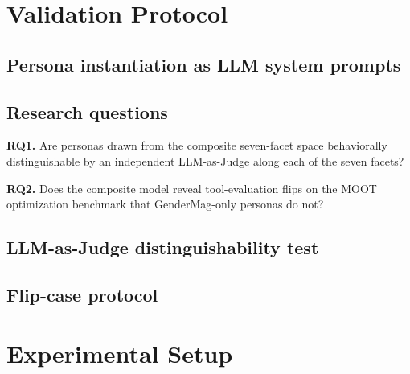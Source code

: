 \documentclass[10pt,conference]{IEEEtran}
\begin{document}
\section{Validation Protocol}
\label{sec:method}


\subsection{Persona instantiation as LLM system prompts}

\subsection{Research questions}
\textbf{RQ1.} Are personas drawn from the composite seven-facet space
behaviorally distinguishable by an independent LLM-as-Judge along each of
the seven facets?

\textbf{RQ2.} Does the composite model reveal tool-evaluation flips on the
MOOT optimization benchmark that GenderMag-only personas do not?

\subsection{LLM-as-Judge distinguishability test}

\subsection{Flip-case protocol}

\section{Experimental Setup}
\label{sec:setup}
\end{document}
